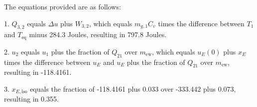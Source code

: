 The equations provided are as follows:

1. \( Q_{3,2} \) equals \( \Delta u \) plus \( W_{3,2} \), which equals \( m_{g,1} C_v \) times the difference between \( T_{1} \) and \( T_{\text{eq}} \) minus 284.3 Joules, resulting in 797.8 Joules.

2. \( u_{2} \) equals \( u_{1} \) plus the fraction of \( Q_{21} \) over \( m_{\text{ew}} \), which equals \( u_{E}(0) \) plus \( x_{E} \) times the difference between \( u_{E} \) and \( u_{E} \) plus the fraction of \( Q_{21} \) over \( m_{\text{ew}} \), resulting in -118.4161.

3. \( x_{E, \text{iso}} \) equals the fraction of -118.4161 plus 0.033 over -333.442 plus 0.073, resulting in 0.355.